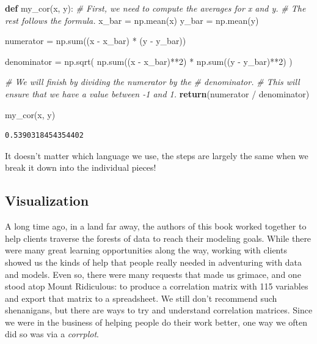 \documentclass[
  letterpaper,
]{krantz}
\newenvironment{Shaded}{}{}
\newcommand{\BuiltInTok}[1]{\textcolor[rgb]{0.00,0.50,0.00}{#1}}
\newcommand{\CommentTok}[1]{\textcolor[rgb]{0.38,0.63,0.69}{\textit{#1}}}
\newcommand{\ControlFlowTok}[1]{\textcolor[rgb]{0.00,0.44,0.13}{\textbf{#1}}}
\newcommand{\DecValTok}[1]{\textcolor[rgb]{0.25,0.63,0.44}{#1}}
\newcommand{\KeywordTok}[1]{\textcolor[rgb]{0.00,0.44,0.13}{\textbf{#1}}}
\newcommand{\NormalTok}[1]{#1}
\newcommand{\OperatorTok}[1]{\textcolor[rgb]{0.40,0.40,0.40}{#1}}
\begin{document}
\begin{Shaded}
\begin{Highlighting}[]
\KeywordTok{def}\NormalTok{ my\_cor(x, y):}
  \CommentTok{\# First, we need to compute the averages for x and y.}
  \CommentTok{\# The rest follows the formula.}
\NormalTok{    x\_bar }\OperatorTok{=}\NormalTok{ np.mean(x)}
\NormalTok{    y\_bar }\OperatorTok{=}\NormalTok{ np.mean(y)}
    
\NormalTok{    numerator }\OperatorTok{=}\NormalTok{ np.}\BuiltInTok{sum}\NormalTok{((x }\OperatorTok{{-}}\NormalTok{ x\_bar) }\OperatorTok{*}\NormalTok{ (y }\OperatorTok{{-}}\NormalTok{ y\_bar))}
    
\NormalTok{    denominator }\OperatorTok{=}\NormalTok{ np.sqrt(}
\NormalTok{      np.}\BuiltInTok{sum}\NormalTok{((x }\OperatorTok{{-}}\NormalTok{ x\_bar)}\OperatorTok{**}\DecValTok{2}\NormalTok{) }\OperatorTok{*}\NormalTok{ np.}\BuiltInTok{sum}\NormalTok{((y }\OperatorTok{{-}}\NormalTok{ y\_bar)}\OperatorTok{**}\DecValTok{2}\NormalTok{)}
\NormalTok{    )}

    \CommentTok{\# We will finish by dividing the numerator by the }
    \CommentTok{\# denominator.}
    \CommentTok{\# This will ensure that we have a value between {-}1 and 1.}
    \ControlFlowTok{return}\NormalTok{(numerator }\OperatorTok{/}\NormalTok{ denominator)}

\NormalTok{my\_cor(x, y)}
\end{Highlighting}
\end{Shaded}

\begin{verbatim}
0.5390318454354402
\end{verbatim}

It doesn't matter which language we use, the steps are largely the same
when we break it down into the individual pieces!

\subsection{Visualization}\label{visualization}

A long time ago, in a land far away, the authors of this book worked
together to help clients traverse the forests of data to reach their
modeling goals. While there were many great learning opportunities along
the way, working with clients showed us the kinds of help that people
really needed in adventuring with data and models. Even so, there were
many requests that made us grimace, and one stood atop Mount Ridiculous:
to produce a correlation matrix with 115 variables and export that
matrix to a spreadsheet. We still don't recommend such shenanigans, but
there are ways to try and understand correlation matrices. Since we were
in the business of helping people do their work better, one way we often
did so was via a \emph{corrplot}.
\end{document}
